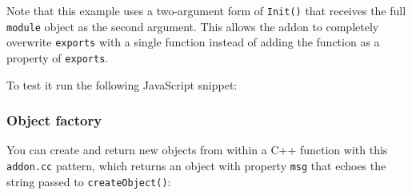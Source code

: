 Note that this example uses a two-argument form of \texttt{Init()} that
receives the full \texttt{module} object as the second argument. This
allows the addon to completely overwrite \texttt{exports} with a single
function instead of adding the function as a property of
\texttt{exports}.

To test it run the following JavaScript snippet:

\begin{Shaded}
\begin{Highlighting}[]
 \NormalTok{(}\NormalTok{);}

\NormalTok{(}
\NormalTok{\});}
\end{Highlighting}
\end{Shaded}

\subsubsection{Object factory}\label{object-factory}

You can create and return new objects from within a C++ function with
this \texttt{addon.cc} pattern, which returns an object with property
\texttt{msg} that echoes the string passed to \texttt{createObject()}:

\begin{Shaded}
\begin{Highlighting}[]
\NormalTok{>}


 \NormalTok{(} 
  \NormalTok{::}\NormalTok{();}

  \NormalTok{::}\NormalTok{();}
  \NormalTok{(}\NormalTok{::}\NormalTok{), args[}\NormalTok{]->}\NormalTok{());}

\NormalTok{\}}

 
\NormalTok{\}}

\end{Highlighting}
\end{Shaded}

